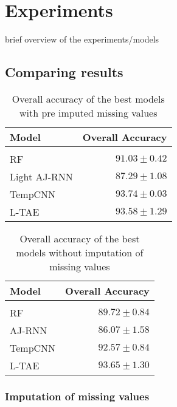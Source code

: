 \chapter{Experiments}
brief overview of the experiments/models


\pagebreak

\pagebreak

\pagebreak

\pagebreak


\section{Comparing results}

\begin{table}[H]
  \centering
    \begin{tabular}{lr}
    Model                       & Overall Accuracy             \\[0.2cm] 
    \hline \\[-0.2cm]
    RF            & $91.03 \pm 0.42$\\
    Light AJ-RNN  & $87.29 \pm 1.08$\\
    TempCNN       & $93.74 \pm 0.03$\\
    L-TAE         & $93.58 \pm 1.29$
    \end{tabular}
  \caption{Overall accuracy of the best models with pre imputed missing values}
  \label{tab:ALLresultsImputed} 
\end{table}

\begin{table}[H]
  \centering
    \begin{tabular}{lr}
    Model                       & Overall Accuracy             \\[0.2cm] 
    \hline \\[-0.2cm]
    RF      & $89.72 \pm 0.84$\\
    AJ-RNN  & $86.07 \pm 1.58$\\
    TempCNN & $92.57 \pm 0.84$\\
    L-TAE   & $93.65 \pm 1.30$
    \end{tabular}
  \caption{Overall accuracy of the best models without imputation of missing values} 
  \label{tab:ALLresultsNoImputed}
\end{table}

\subsection{Imputation of missing values}


